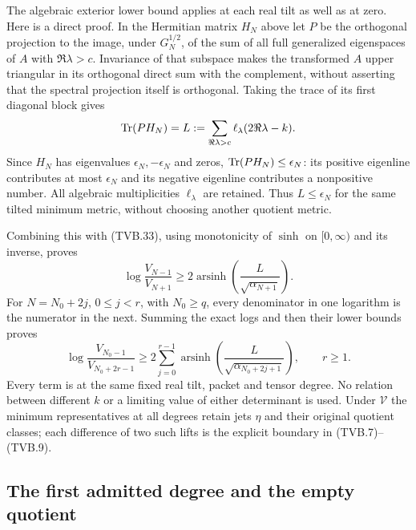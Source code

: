 The algebraic exterior lower bound applies at each real tilt as
well as at zero. Here is a direct proof. In the Hermitian matrix
$H_N$ above let $P$ be the orthogonal projection to the image,
under $G_N^{1/2}$, of the sum of all full generalized eigenspaces
of $A$ with $\Re\lambda>c$. Invariance of that subspace makes
the transformed $A$ upper triangular in its orthogonal direct sum
with the complement, without asserting that the spectral projection
itself is orthogonal. Taking the trace of its first diagonal block
gives
\[
 \operatorname{Tr}(PH_N)=
 L:=\sum_{\Re\lambda>c}\ell_\lambda(2\Re\lambda-k).
\]
Since $H_N$ has eigenvalues $\epsilon_N,-\epsilon_N$ and zeros,
$\operatorname{Tr}(PH_N)\le\epsilon_N$: its positive eigenline contributes
at most $\epsilon_N$ and its negative eigenline contributes a
nonpositive number. All algebraic multiplicities
$\ell_\lambda$ are retained. Thus $L\le\epsilon_N$ for the
same tilted minimum metric, without choosing another quotient
metric.

Combining this with (TVB.33), using monotonicity of $\sinh$ on
$[0,\infty)$ and its inverse, proves
\[
 \log\frac{V_{N-1}}{V_{N+1}}
 \ge2\operatorname{arsinh}\left(\frac{L}{\sqrt{\alpha_{N+1}}}\right).
 \tag{TVB.35}
\]
For $N=N_0+2j$, $0\le j<r$, with $N_0\ge q$, every denominator
in one logarithm is the numerator in the next. Summing the exact
logs and then their lower bounds proves
\[
 \log\frac{V_{N_0-1}}{V_{N_0+2r-1}}
 \ge2\sum_{j=0}^{r-1}
       \operatorname{arsinh}\left(
       \frac{L}{\sqrt{\alpha_{N_0+2j+1}}}\right),\qquad r\ge1.
 \tag{TVB.36}
\]
Every term is at the same fixed real tilt, packet and tensor degree.
No relation between different $k$ or a limiting value of either
determinant is used. Under $\mathcal V$ the minimum representatives
at all degrees retain jets $\eta$ and their original quotient
classes; each difference of two such lifts is the explicit boundary
in (TVB.7)--(TVB.9).

\subsection{The first admitted degree and the empty quotient}

